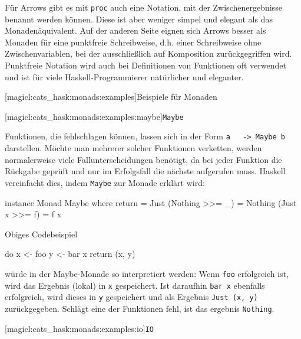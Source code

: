 \documentclass[a4paper, bibgerm]{book}
\newcommand\icode[1]{\lstinline?#1?}
\newcommand\lsubsubsection{}
\newcommand\lparagraph{}
\begin{document}
Für Arrows gibt es mit \icode{proc} auch eine Notation, mit der
Zwischenergebnisse benannt werden können. Diese ist aber weniger simpel
und elegant als das Monadenäquivalent. Auf der anderen Seite eignen sich
Arrows besser als Monaden für eine punktfreie Schreibweise, d.h. einer
Schreibweise ohne Zwischenvariablen, bei der ausschließlich auf
Komposition zurückgegriffen wird. Punktfreie Notation wird auch bei
Definitionen von Funktionen oft verwendet und ist für viele
Haskell-Programmierer natürlicher und eleganter.

\lsubsubsection[magicl:cats_hask:monads:examples]{Beispiele für Monaden}

\lparagraph[magicl:cats_hask:monads:examples:maybe]{\icode{Maybe}}

Funktionen, die fehlschlagen können, lassen sich in der Form \icode{a
  -> Maybe b} darstellen. Möchte man mehrerer solcher Funktionen
verketten, werden normalerweise viele Fallunterscheidungen benötigt, da
bei jeder Funktion die Rückgabe geprüft und nur im Erfolgsfall die
nächste aufgerufen muss. Haskell vereinfacht dies, indem \icode{Maybe}
zur Monade erklärt wird:
\begin{code}
instance Monad Maybe 
  where return = Just
        (Nothing >>= _) = Nothing
        (Just x  >>= f) = f x
\end{code} %
Obiges Codebeispiel
\begin{code}
do x <- foo
   y <- bar x
   return (x, y)
\end{code}
würde in der Maybe-Monade so interpretiert werden: Wenn \icode{foo}
erfolgreich ist, wird das Ergebnis (lokal) in \icode{x} gespeichert. Ist
daraufhin \icode{bar x} ebenfalls erfolgreich, wird dieses in \icode{y}
gespeichert und als Ergebnis \icode{Just (x, y)} zurückgegeben. Schlägt
eine der Funktionen fehl, ist das ergebnis \icode{Nothing}.

\lparagraph[magicl:cats_hask:monads:examples:io]{\icode{IO}}
\end{document}

